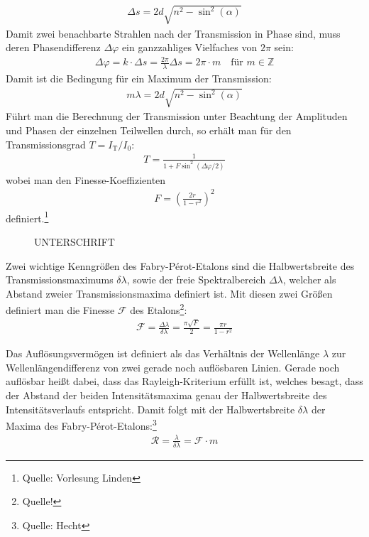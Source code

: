 \documentclass[11pt, a4paper]{article}
\begin{document}
\begin{align}
	\Delta s = 2 d \sqrt{n^2 - \sin^2(\alpha)}
\end{align}
Damit zwei benachbarte Strahlen nach der Transmission in Phase sind, muss deren Phasendifferenz $\Delta \varphi$ ein ganzzahliges Vielfaches von $2\pi$ sein:
\begin{align}
	\Delta \varphi = k \cdot \Delta s = \frac{2\pi}{\lambda} \Delta s = 2 \pi \cdot m \quad \text{für } m \in \mathbb{Z}
\end{align}
Damit ist die Bedingung für ein Maximum der Transmission:
\begin{align}
	m \lambda = 2 d \sqrt{n^2 - \sin^2(\alpha)}
	\label{eq:interferenzbedingung}
\end{align}
Führt man die Berechnung der Transmission unter Beachtung der Amplituden und Phasen der einzelnen Teilwellen durch, so erhält man für den Transmissionsgrad $T = I_\mathrm{T} / I_0$:
\begin{align}
	T = \frac{1}{1 + F \sin^2(\Delta \varphi / 2)}
\end{align}
wobei man den Finesse-Koeffizienten
\begin{align}
	F = \left( \frac{2 r}{1 - r^2} \right)^2
\end{align}
definiert.\footnote{Quelle: Vorlesung Linden}

\begin{figure}[h]
	\centering
	\scalebox{0.9}{
	}
	\caption{UNTERSCHRIFT}
	\label{fig:fabry_transmission}
\end{figure}

Zwei wichtige Kenngrößen des Fabry-Pérot-Etalons sind die Halbwertsbreite des Transmissionsmaximums $\delta \lambda$, sowie der freie Spektralbereich $\Delta \lambda$, welcher als Abstand zweier Transmissionsmaxima definiert ist.
Mit diesen zwei Größen definiert man die Finesse $\mathcal{F}$ des Etalons\footnote{Quelle!}:
\begin{align}
	\mathcal{F} = \frac{\Delta \lambda}{\delta \lambda} = \frac{\pi \sqrt{F}}{2} = \frac{\pi r}{1 - r^2}
\end{align}

Das Auflösungsvermögen ist definiert als das Verhältnis der Wellenlänge $\lambda$ zur Wellenlängendifferenz von zwei gerade noch auflösbaren Linien.
Gerade noch auflösbar heißt dabei, dass das Rayleigh-Kriterium erfüllt ist, welches besagt, dass der Abstand der beiden Intensitätsmaxima genau der Halbwertsbreite des Intensitätsverlaufs entspricht.
Damit folgt mit der Halbwertsbreite $\delta \lambda$ der Maxima des Fabry-Pérot-Etalons:\footnote{Quelle: Hecht}
\begin{align}
	\mathcal{R} = \frac{\lambda}{\delta \lambda} = \mathcal{F} \cdot m
	\label{eq:aufloesung}
\end{align}
\end{document}
